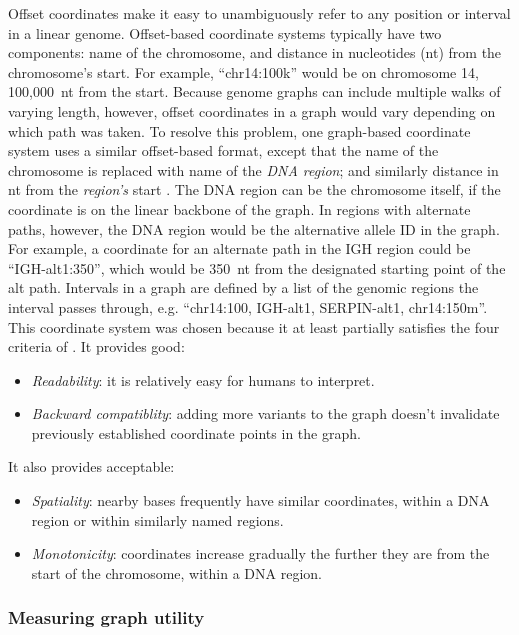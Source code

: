 Offset coordinates make it easy to unambiguously refer to any position or interval in a linear genome.
Offset-based coordinate systems typically have two components: name of the chromosome, and distance in nucleotides (nt) from the chromosome's start.
For example, ``chr14:100k'' would be on chromosome 14, 100,000~nt from the start.
Because genome graphs can include multiple walks of varying length, however, offset coordinates in a graph would vary depending on which path was taken.
To resolve this problem, one graph-based coordinate system uses a similar offset-based format, except that the name of the chromosome is replaced with name of the \emph{DNA region}; and similarly distance in nt from the \emph{region's} start \cite{Rand_2016}. 
The DNA region can be the chromosome itself, if the coordinate is on the linear backbone of the graph.
In regions with alternate paths, however, the DNA region would be the alternative allele ID in the graph.
For example, a coordinate for an alternate path in the IGH region could be ``IGH-alt1:350'', which would be 350~nt from the designated starting point of the alt path.
Intervals in a graph are defined by a list of the genomic regions the interval passes through, e.g. ``chr14:100, IGH-alt1, SERPIN-alt1, chr14:150m''.
This coordinate system was chosen because it at least partially satisfies the four criteria of \citeauthor{Rand_2016}. It provides good:
\begin{itemize}
    \item \emph{Readability}: it is relatively easy for humans to interpret.
    \item \emph{Backward compatiblity}: adding more variants to the graph doesn't invalidate previously established coordinate points in the graph.
\end{itemize}
It also provides acceptable:
\begin{itemize}
    \item \emph{Spatiality}: nearby bases frequently have similar coordinates, within a DNA region or within similarly named regions.
    \item \emph{Monotonicity}: coordinates increase gradually the further they are from the start of the chromosome, within a DNA region.
\end{itemize}


\subsubsection{Measuring graph utility}

